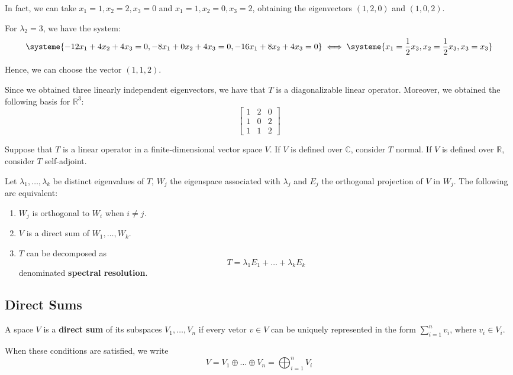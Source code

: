 \begin{example}
	In fact, we can take $x_1 = 1, x_2 = 2, x_3 = 0$ and $x_1 = 1, x_2 = 0, x_3 = 2$, obtaining the eigenvectors $(1,2,0)$ and $(1,0,2)$.

	For $\lambda_2 = 3$, we have the system:
	\[
		\systeme{-12x_1 + 4 x_2 + 4x_3 = 0, -8x_1+0x_2+4x_3 = 0, -16x_1+8x_2+4x_3 = 0} \iff \systeme{x_1 = \frac{1}{2} x_3, x_2 = \frac{1}{2} x_3, x_3 = x_3}
	\]

	Hence, we can choose the vector $(1,1,2)$.

	Since we obtained three linearly independent eigenvectors, we have that $T$ is a diagonalizable linear operator. Moreover, we obtained the following basis for $\mathbb{R}^3$:
	\[
		\begin{bmatrix}
		1 & 2 & 0 \\
		1 & 0 & 2 \\
		1 & 1 & 2
		\end{bmatrix}
	\]
\end{example}

\begin{theorem}
	Suppose that $T$ is a linear operator in a finite-dimensional vector space $V$. If $V$ is defined over $\mathbb{C}$, consider $T$ normal. If $V$ is defined over $\mathbb{R}$, consider $T$ self-adjoint.

	Let $\lambda_1, \ldots, \lambda_k$ be distinct eigenvalues of $T$, $W_j$ the eigenspace associated with $\lambda_j$ and $E_j$ the orthogonal projection of $V$ in $W_j$. The following are equivalent:
	\begin{enumerate}
	\item $W_j$ is orthogonal to $W_i$ when $i \neq j$.
	\item $V$ is a direct sum of $W_1, \ldots, W_k$.
	\item $T$ can be decomposed as \[T = \lambda_1 E_1 + \ldots + \lambda_k E_k\] denominated \textbf{spectral resolution}.
	\end{enumerate}
\end{theorem}

\subsection{Direct Sums}

\begin{definition}
	A space $V$ is a \textbf{direct sum} of its subspaces $V_1, \ldots, V_n$ if every vetor $v \in V$ can be uniquely represented in the form $\sum_{i=1}^n v_i$, where $v_i \in V_i$.

	When these conditions are satisfied, we write
	\[
		V = V_1 \oplus \ldots \oplus V_n = \bigoplus_{i=1}^n V_i
	\]
\end{definition}

